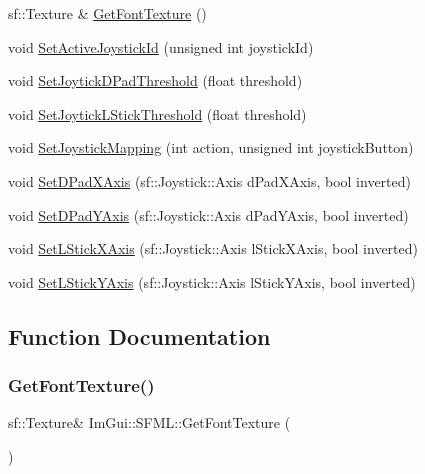 \begin{DoxyCompactItemize}
\item 
sf\+::\+Texture \& \mbox{\hyperlink{namespace_im_gui_1_1_s_f_m_l_af66dae79d407cf9230b3e1f2b5e9bdb2}{Get\+Font\+Texture}} ()
\item 
void \mbox{\hyperlink{namespace_im_gui_1_1_s_f_m_l_a51d36e563d2086a841e75a41ecad36b5}{Set\+Active\+Joystick\+Id}} (unsigned int joystick\+Id)
\item 
void \mbox{\hyperlink{namespace_im_gui_1_1_s_f_m_l_a54d0428403fd1887a604b3dc4c8be73b}{Set\+Joytick\+D\+Pad\+Threshold}} (float threshold)
\item 
void \mbox{\hyperlink{namespace_im_gui_1_1_s_f_m_l_a9b55c21ae767d4157720c6bd140bc322}{Set\+Joytick\+L\+Stick\+Threshold}} (float threshold)
\item 
void \mbox{\hyperlink{namespace_im_gui_1_1_s_f_m_l_ad29306aafc29f65a72ec8bcc1e86330f}{Set\+Joystick\+Mapping}} (int action, unsigned int joystick\+Button)
\item 
void \mbox{\hyperlink{namespace_im_gui_1_1_s_f_m_l_ad5fc8ad9c8dfddae6034e86b2a23ff99}{Set\+D\+Pad\+X\+Axis}} (sf\+::\+Joystick\+::\+Axis d\+Pad\+X\+Axis, bool inverted)
\item 
void \mbox{\hyperlink{namespace_im_gui_1_1_s_f_m_l_ad940e87612d00f2a733bfd8813b88523}{Set\+D\+Pad\+Y\+Axis}} (sf\+::\+Joystick\+::\+Axis d\+Pad\+Y\+Axis, bool inverted)
\item 
void \mbox{\hyperlink{namespace_im_gui_1_1_s_f_m_l_a00ca41769ea566cb6210441bfe505028}{Set\+L\+Stick\+X\+Axis}} (sf\+::\+Joystick\+::\+Axis l\+Stick\+X\+Axis, bool inverted)
\item 
void \mbox{\hyperlink{namespace_im_gui_1_1_s_f_m_l_a8e86bef226400c4591343e06670210d7}{Set\+L\+Stick\+Y\+Axis}} (sf\+::\+Joystick\+::\+Axis l\+Stick\+Y\+Axis, bool inverted)
\end{DoxyCompactItemize}


\subsection{Function Documentation}
\mbox{\label{namespace_im_gui_1_1_s_f_m_l_af66dae79d407cf9230b3e1f2b5e9bdb2}} 
\subsubsection{\texorpdfstring{Get\+Font\+Texture()}{GetFontTexture()}}
{\footnotesize\ttfamily sf\+::\+Texture\& Im\+Gui\+::\+S\+F\+M\+L\+::\+Get\+Font\+Texture (\begin{DoxyParamCaption}{ }\end{DoxyParamCaption})}

